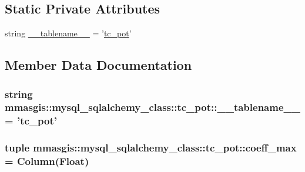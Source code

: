 \subsection*{Static Private Attributes}
\begin{DoxyCompactItemize}
\item 
string \hyperlink{classmmasgis_1_1mysql__sqlalchemy__class_1_1tc__pot_a323618bfa9b4a15d4ef44c6625cc5a08}{\_\-\_\-tablename\_\-\_\-} = '\hyperlink{classmmasgis_1_1mysql__sqlalchemy__class_1_1tc__pot}{tc\_\-pot}'
\end{DoxyCompactItemize}


\subsection{Member Data Documentation}
\hypertarget{classmmasgis_1_1mysql__sqlalchemy__class_1_1tc__pot_a323618bfa9b4a15d4ef44c6625cc5a08}{
\subsubsection[{\_\-\_\-tablename\_\-\_\-}]{\setlength{\rightskip}{0pt plus 5cm}string {\bf mmasgis::mysql\_\-sqlalchemy\_\-class::tc\_\-pot::\_\-\_\-tablename\_\-\_\-} = '{\bf tc\_\-pot}'}}
\label{classmmasgis_1_1mysql__sqlalchemy__class_1_1tc__pot_a323618bfa9b4a15d4ef44c6625cc5a08}
\hypertarget{classmmasgis_1_1mysql__sqlalchemy__class_1_1tc__pot_a2c6ec5710e8ea2df46a43e27f1313c34}{
\subsubsection[{coeff\_\-max}]{\setlength{\rightskip}{0pt plus 5cm}tuple {\bf mmasgis::mysql\_\-sqlalchemy\_\-class::tc\_\-pot::coeff\_\-max} = Column(Float)}}
\label{classmmasgis_1_1mysql__sqlalchemy__class_1_1tc__pot_a2c6ec5710e8ea2df46a43e27f1313c34}
